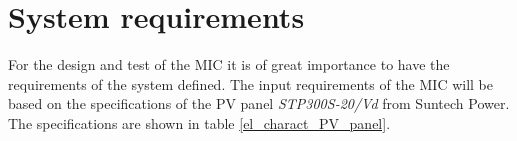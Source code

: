 \section{System requirements}

For the design and test of the MIC it is of great importance to have the requirements of the system defined. The input requirements of the MIC will be based on the specifications of the PV panel \textit{STP300S-20/Vd} from Suntech Power. The specifications are shown in table \ref{el_charact_PV_panel}.


